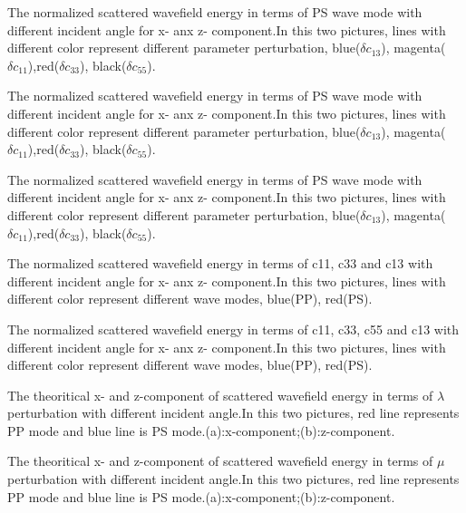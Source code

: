{The normalized scattered wavefield energy in terms of PS wave mode with
different incident angle for x- anx z- component.In this two pictures, lines with
different color represent different parameter perturbation, blue($\delta c_{13}$),
magenta($\delta c_{11}$),red($\delta c_{33}$), black($\delta c_{55}$).
	}

{The normalized scattered wavefield energy in terms of PS wave mode with
different incident angle for x- anx z- component.In this two pictures, lines with
different color represent different parameter perturbation, blue($\delta c_{13}$),
magenta($\delta c_{11}$),red($\delta c_{33}$), black($\delta c_{55}$).
	}

{The normalized scattered wavefield energy in terms of PS wave mode with
different incident angle for x- anx z- component.In this two pictures, lines with
different color represent different parameter perturbation, blue($\delta c_{13}$),
magenta($\delta c_{11}$),red($\delta c_{33}$), black($\delta c_{55}$).
	}

{The normalized scattered wavefield energy in terms of c11, c33 and c13 with
different incident angle for x- anx z- component.In this two pictures, lines with
different color represent different wave modes, blue(PP),
red(PS).
	}

{The normalized scattered wavefield energy in terms of c11, c33, c55 and c13 with
different incident angle for x- anx z- component.In this two pictures, lines with
different color represent different wave modes, blue(PP),
red(PS).
	}

{The theoritical x- and z-component of scattered wavefield energy in terms of $\lambda$ perturbation with
different incident angle.In this two pictures, red line represents PP mode and blue line is PS
	mode.(a):x-component;(b):z-component.
	}

{The theoritical x- and z-component of scattered wavefield energy in terms of $\mu$ perturbation with
different incident angle.In this two pictures, red line represents PP mode and blue line is PS
	mode.(a):x-component;(b):z-component.
	}

